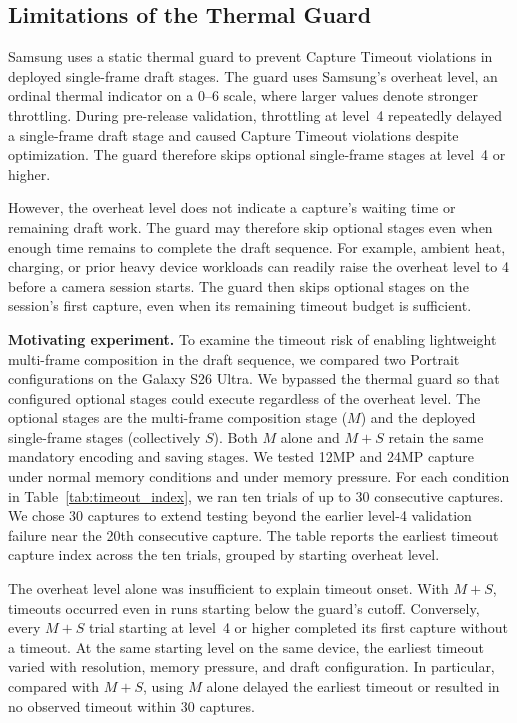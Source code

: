 \subsection{Limitations of the Thermal Guard}
\label{sec:guard-limit}

Samsung uses a static thermal guard to prevent Capture Timeout violations in deployed single-frame draft stages.
The guard uses Samsung's overheat level, an ordinal thermal indicator on a 0--6 scale, where larger values denote stronger throttling.
During pre-release validation, throttling at level~4 repeatedly delayed a single-frame draft stage and caused Capture Timeout violations despite optimization.
The guard therefore skips optional single-frame stages at level~4 or higher.

However, the overheat level does not indicate a capture's waiting time or remaining draft work.
The guard may therefore skip optional stages even when enough time remains to complete the draft sequence.
For example, ambient heat, charging, or prior heavy device workloads can readily raise the overheat level to 4 before a camera session starts.
The guard then skips optional stages on the session's first capture, even when its remaining timeout budget is sufficient.

\smallskip\noindent\textbf{Motivating experiment.}
To examine the timeout risk of enabling lightweight multi-frame composition in the draft sequence, we compared two Portrait configurations on the Galaxy S26 Ultra.
We bypassed the thermal guard so that configured optional stages could execute regardless of the overheat level.
The optional stages are the multi-frame composition stage (\(M\)) and the deployed single-frame stages (collectively \(S\)).
Both \(M\) alone and \(M+S\) retain the same mandatory encoding and saving stages.
We tested 12MP and 24MP capture under normal memory conditions and under memory pressure.
For each condition in Table~\ref{tab:timeout_index}, we ran ten trials of up to 30 consecutive captures.
We chose 30 captures to extend testing beyond the earlier level-4 validation failure near the 20th consecutive capture.
The table reports the earliest timeout capture index across the ten trials, grouped by starting overheat level.



The overheat level alone was insufficient to explain timeout onset.
With \(M+S\), timeouts occurred even in runs starting below the guard's cutoff.
Conversely, every \(M+S\) trial starting at level~4 or higher completed its first capture without a timeout.
At the same starting level on the same device, the earliest timeout varied with resolution, memory pressure, and draft configuration.
In particular, compared with \(M+S\), using \(M\) alone delayed the earliest timeout or resulted in no observed timeout within 30 captures.

